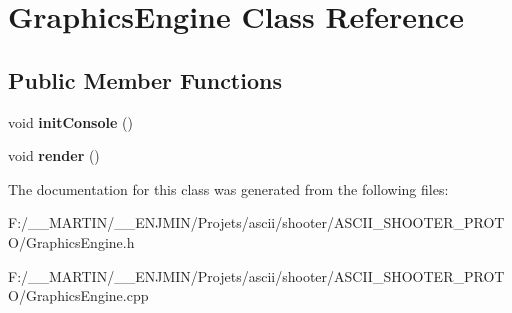 \hypertarget{class_graphics_engine}{}\section{Graphics\+Engine Class Reference}
\label{class_graphics_engine}
\subsection*{Public Member Functions}
\begin{DoxyCompactItemize}
\item 
\hypertarget{class_graphics_engine_a854823b6346b54852e1c3bfdc20cf8c9}{}\label{class_graphics_engine_a854823b6346b54852e1c3bfdc20cf8c9} 
void {\bfseries init\+Console} ()
\item 
\hypertarget{class_graphics_engine_adef77faf4662503f4b6d2036ac9184fa}{}\label{class_graphics_engine_adef77faf4662503f4b6d2036ac9184fa} 
void {\bfseries render} ()
\end{DoxyCompactItemize}


The documentation for this class was generated from the following files\+:\begin{DoxyCompactItemize}
\item 
F\+:/\+\_\+\+\_\+\+M\+A\+R\+T\+I\+N/\+\_\+\+\_\+\+E\+N\+J\+M\+I\+N/\+Projets/ascii/shooter/\+A\+S\+C\+I\+I\+\_\+\+S\+H\+O\+O\+T\+E\+R\+\_\+\+P\+R\+O\+T\+O/Graphics\+Engine.\+h\item 
F\+:/\+\_\+\+\_\+\+M\+A\+R\+T\+I\+N/\+\_\+\+\_\+\+E\+N\+J\+M\+I\+N/\+Projets/ascii/shooter/\+A\+S\+C\+I\+I\+\_\+\+S\+H\+O\+O\+T\+E\+R\+\_\+\+P\+R\+O\+T\+O/Graphics\+Engine.\+cpp\end{DoxyCompactItemize}
